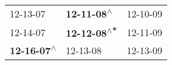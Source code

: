 \begin{supertabular}{lll}
                  12-13-07\textsuperscript{} &   \textbf{12-11-08\textsuperscript{$\wedge$}} &  12-10-09\textsuperscript{} \\
                  12-14-07\textsuperscript{} &  \textbf{12-12-08\textsuperscript{$\wedge$*}} &  12-11-09\textsuperscript{} \\
 \textbf{12-16-07\textsuperscript{$\wedge$}} &                    12-13-08\textsuperscript{} &  12-13-09\textsuperscript{} \\
\end{supertabular}
